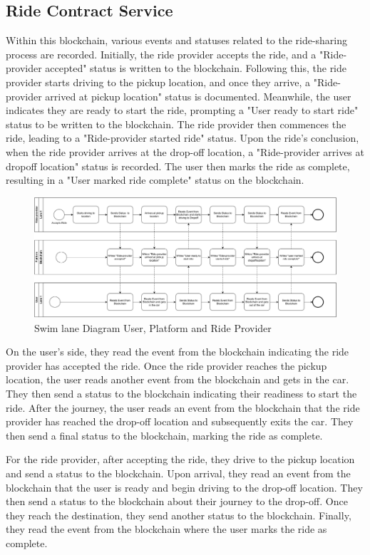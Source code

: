 \subsection{Ride Contract Service}

Within this blockchain, various events and statuses related to the ride-sharing process are recorded. Initially, the ride provider accepts the ride, and a "Ride-provider accepted" status is written to the blockchain. Following this, the ride provider starts driving to the pickup location, and once they arrive, a "Ride-provider arrived at pickup location" status is documented. Meanwhile, the user indicates they are ready to start the ride, prompting a "User ready to start ride" status to be written to the blockchain. The ride provider then commences the ride, leading to a "Ride-provider started ride" status. Upon the ride's conclusion, when the ride provider arrives at the drop-off location, a "Ride-provider arrives at dropoff location" status is recorded. The user then marks the ride as complete, resulting in a "User marked ride complete" status on the blockchain.

\begin{figure}[h]
    \centering
    \includegraphics[width=\linewidth]{data/1.svg}
    \caption{Swim lane Diagram User, Platform and Ride Provider}
    \label{fig:directSVG}
\end{figure}

On the user's side, they read the event from the blockchain indicating the ride provider has accepted the ride. Once the ride provider reaches the pickup location, the user reads another event from the blockchain and gets in the car. They then send a status to the blockchain indicating their readiness to start the ride. After the journey, the user reads an event from the blockchain that the ride provider has reached the drop-off location and subsequently exits the car. They then send a final status to the blockchain, marking the ride as complete.

For the ride provider, after accepting the ride, they drive to the pickup location and send a status to the blockchain. Upon arrival, they read an event from the blockchain that the user is ready and begin driving to the drop-off location. They then send a status to the blockchain about their journey to the drop-off. Once they reach the destination, they send another status to the blockchain. Finally, they read the event from the blockchain where the user marks the ride as complete.

